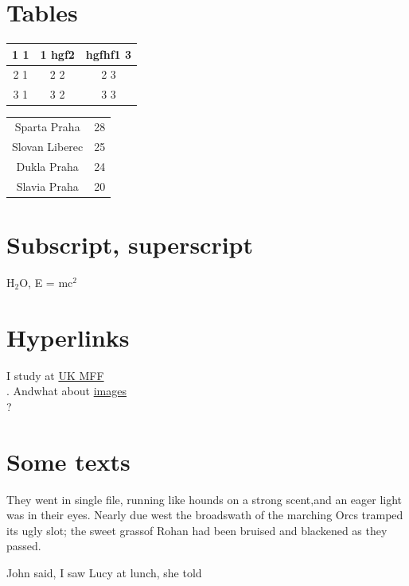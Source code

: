 \documentclass{article}
\begin{document}
 \section*{Tables} 
 \begin{table}[!ht]

 \begin{tabular}
{ |c|c|c| }
\hline   1 1 & 1 hgf2 & hgfhf1 3\\ 
\hline 2 1 & 2 2 & 2 3\\ 
\hline 3 1 & 3 2 & 3 3\\ 
\hline 
 \end{tabular}
\end{table}


 \begin{table}[!ht]

 \begin{tabular}
{ c c  }
   Sparta Praha & 28\\ 
 Slovan Liberec & 25\\ 
 Dukla Praha & 24\\ 
 Slavia Praha & 20\\ 
 
 \end{tabular}
\end{table}
 \section*{Subscript, superscript} \par H\(_{2}\)O, E = mc\(^{2}\)
 \section*{Hyperlinks} \par I study at \href{http://www.mff.cuni.cz}{UK MFF} \\ 
. Andwhat about \href{#img}{images} \\ 
?
 \section*{Some texts} \par \begin{center}
They went in single file, running like hounds on a strong scent,and an eager light was in their eyes. Nearly due west the broadswath of the marching \small Orcs tramped\normalsize 
its ugly slot; the sweet grassof Rohan had been bruised and blackened as they passed.\end{center}

\par John said, I saw Lucy at lunch, she told
\end{document}
